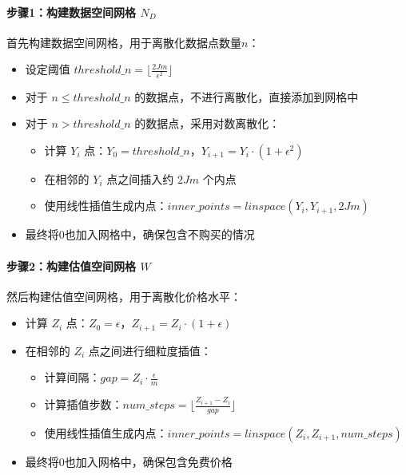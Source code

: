 \paragraph{步骤1：构建数据空间网格 $N_D$}

首先构建数据空间网格，用于离散化数据点数量$n$：

\begin{itemize}
    \item 设定阈值 $threshold\_n = \lfloor \frac{2Jm}{\epsilon^2} \rfloor$
    \item 对于 $n \leq threshold\_n$ 的数据点，不进行离散化，直接添加到网格中
    \item 对于 $n > threshold\_n$ 的数据点，采用对数离散化：
    \begin{itemize}
        \item 计算 $Y_i$ 点：$Y_0 = threshold\_n$，$Y_{i+1} = Y_i \cdot (1 + \epsilon^2)$
        \item 在相邻的 $Y_i$ 点之间插入约 $2Jm$ 个内点
        \item 使用线性插值生成内点：$inner\_points = linspace(Y_i, Y_{i+1}, 2Jm)$
    \end{itemize}
    \item 最终将0也加入网格中，确保包含不购买的情况
\end{itemize}

\paragraph{步骤2：构建估值空间网格 $W$}

然后构建估值空间网格，用于离散化价格水平：

\begin{itemize}
    \item 计算 $Z_i$ 点：$Z_0 = \epsilon$，$Z_{i+1} = Z_i \cdot (1 + \epsilon)$
    \item 在相邻的 $Z_i$ 点之间进行细粒度插值：
    \begin{itemize}
        \item 计算间隔：$gap = Z_i \cdot \frac{\epsilon}{m}$
        \item 计算插值步数：$num\_steps = \lfloor \frac{Z_{i+1} - Z_i}{gap} \rfloor$
        \item 使用线性插值生成内点：$inner\_points = linspace(Z_i, Z_{i+1}, num\_steps)$
    \end{itemize}
    \item 最终将0也加入网格中，确保包含免费价格
\end{itemize}

